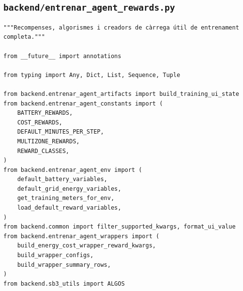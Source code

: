 \documentclass[10pt,a4paper]{article}
\begin{document}
\subsection{\texorpdfstring{\texttt{backend/entrenar\_agent\_rewards.py}}{backend/entrenar\_agent\_rewards.py}}

\begin{lstlisting}[style=studioPython,caption={backend/entrenar\_agent\_rewards.py},label={lst:backend-entrenar-agent-rewards-py}]
"""Recompenses, algorismes i creadors de càrrega útil de entrenament completa."""

from __future__ import annotations

from typing import Any, Dict, List, Sequence, Tuple

from backend.entrenar_agent_artifacts import build_training_ui_state
from backend.entrenar_agent_constants import (
    BATTERY_REWARDS,
    COST_REWARDS,
    DEFAULT_MINUTES_PER_STEP,
    MULTIZONE_REWARDS,
    REWARD_CLASSES,
)
from backend.entrenar_agent_env import (
    default_battery_variables,
    default_grid_energy_variables,
    get_training_meters_for_env,
    load_default_reward_variables,
)
from backend.common import filter_supported_kwargs, format_ui_value
from backend.entrenar_agent_wrappers import (
    build_energy_cost_wrapper_reward_kwargs,
    build_wrapper_configs,
    build_wrapper_summary_rows,
)
from backend.sb3_utils import ALGOS



\end{lstlisting}
\end{document}
